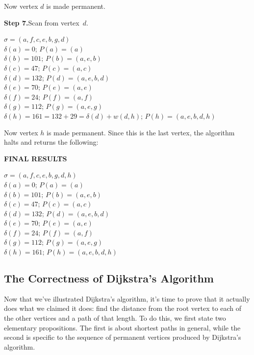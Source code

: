 \endgroup

Now vertex $d$ is made permanent.

\medskip
\textbf{Step 7.}\quad Scan from vertex~$d$.

\begingroup
{}
\rightskip\leftskip

\medskip
$\sigma=(a,f,c,e,b,g,d)$\\
$\delta(a)=0$; $P(a)=(a)$\\
$\delta(b)=101$; $P(b)=(a,e,b)$\\
$\delta(c)=47$; $P(c)=(a,c)$\\
$\delta(d)= 132$; $P(d)=(a,e,b,d)$\\
$\delta(e)=70$; $P(e)=(a,e)$\\
$\delta(f)=24$; $P(f)=(a,f)$\\
$\delta(g)=112$; $P(g)=(a,e,g)$\\
$\delta(h)=161 = 132+29=\delta(d)+w(d,h)$; $P(h)=(a,e,b,d,h)$\quad{}\\

\endgroup

Now vertex $h$ is made permanent. Since this is the last vertex, the
algorithm halts and returns the following:

\medskip
\textbf{FINAL RESULTS}\quad 

\begingroup
{}
\rightskip\leftskip

\medskip
$\sigma=(a,f,c,e,b,g,d,h)$\\
$\delta(a)=0$; $P(a)=(a)$\\
$\delta(b)=101$; $P(b)=(a,e,b)$\\
$\delta(c)=47$; $P(c)=(a,c)$\\
$\delta(d)= 132$; $P(d)=(a,e,b,d)$\\
$\delta(e)=70$; $P(e)=(a,e)$\\
$\delta(f)=24$; $P(f)=(a,f)$\\
$\delta(g)=112$; $P(g)=(a,e,g)$\\
$\delta(h)=161$; $P(h)=(a,e,b,d,h)$\\

\endgroup

\subsection{The Correctness of Dijkstra's Algorithm}

Now that we've illustrated Dijkstra's algorithm, it's time to prove
that it actually does what we claimed it does: find the distance from
the root vertex to each of the other vertices and a path of that
length. To do this, we first state two elementary propositions. The
first is about shortest paths in general, while the second is specific
to the sequence of permanent vertices produced by Dijkstra's algorithm.


